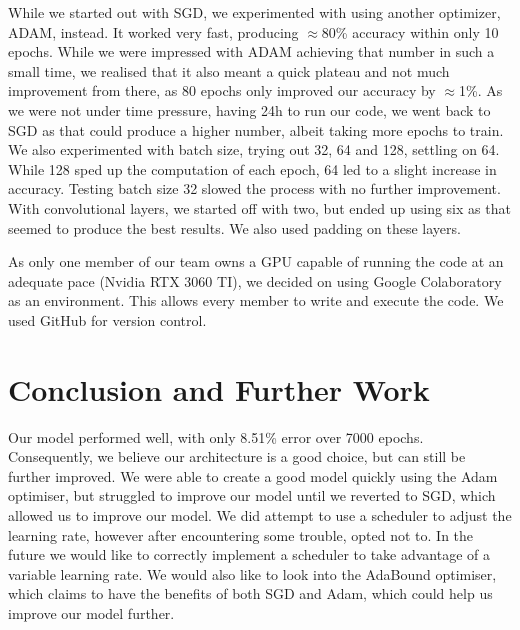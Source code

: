 \documentclass[journal]{IEEEtran}
\begin{document}
While we started out with SGD, we experimented with using another optimizer, ADAM, instead. It worked very fast, producing $\approx$80\% accuracy within only 10 epochs. While we were impressed with ADAM achieving that number in such a small time, we realised that it also meant a quick plateau and not much improvement from there, as 80 epochs only improved our accuracy by $\approx$1\%. As we were not under time pressure, having 24h to run our code, we went back to SGD as that could produce a higher number, albeit taking more epochs to train. We also experimented with batch size, trying out 32, 64 and 128, settling on 64. While 128 sped up the computation of each epoch, 64 led to a slight increase in accuracy. Testing batch size 32 slowed the process with no further improvement. With convolutional layers, we started off with two, but ended up using six as that seemed to produce the best results. We also used padding on these layers.

As only one member of our team owns a GPU capable of running the code at an adequate pace (Nvidia RTX 3060 TI), we decided on using Google Colaboratory as an environment. This allows every member to write and execute the code. We used GitHub for version control. 

\section{Conclusion and Further Work}
Our model performed well, with only 8.51\% error over 7000 epochs. Consequently, we believe our architecture is a good choice, but can still be further improved. We were able to create a good model quickly using the Adam optimiser, but struggled to improve our model until we reverted to SGD, which allowed us to improve our model. We did attempt to use a scheduler to adjust the learning rate, however after encountering some trouble, opted not to. In the future we would like to correctly implement a scheduler to take advantage of a variable learning rate. We would also like to look into the AdaBound optimiser, which claims to have the benefits of both SGD and Adam, which could help us improve our model further.


\ifCLASSOPTIONcaptionsoff
  \newpage
\fi

\printbibliography
\end{document}
